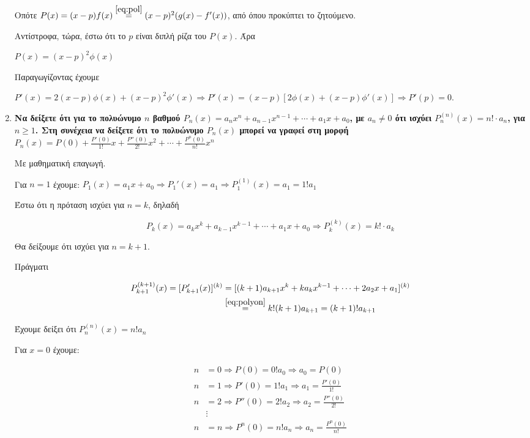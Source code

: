 \begin{enumerate}
\begin{solution}
			Οπότε $ P(x) = (x-p)f(x) \overset{\eqref{eq:pol}}{=} (x-p)^{2}(g(x)
			- f'(x)) $, από όπου προκύπτει το ζητούμενο.

			Αντίστροφα, τώρα, έστω ότι το $p$ είναι διπλή ρίζα του $ P(x) $. Άρα 

			$ P(x) = (x-p)^{2}\phi(x) $

			Παραγωγίζοντας έχουμε

			$ P'(x) = 2(x-p)\phi(x) + (x-p)^{2}\phi'(x) \Rightarrow P'(x) =
			(x-p)[2\phi(x) + (x-p)\phi'(x)] \Rightarrow P'(p) = 0 $.
  \end{solution}

		\item {\bfseries \boldmath Να δείξετε ότι για το πολυώνυμο $n$ βαθμού $ P_{n}(x) =a_{n}x^{n} +
		a_{n-1}x^{n-1} + \cdots + a_{1}x + a_{0} $, με  $ a_{n}\neq 0 $ ότι ισχύει $
		P_{n}^{(n)}(x) = n! \cdot a_{n}$, για  $n\geq 1 $. Στη συνέχεια να
		δείξετε ότι το πολυώνυμο $ P_{n}(x) $ μπορεί να γραφεί στη μορφή $ P_{n}(x) =
		P(0) + \frac{P'(0)}{1!} x + \frac{P''(0)}{2!} x^{2} + \cdots +
	\frac{P^{n}(0)}{n!} x^{n}$} 

  \begin{solution}


		Με μαθηματική επαγωγή.

		Για $ n=1 $ έχουμε: $ P_{1}(x) = a_{1}x + a_{0} \Rightarrow P_{1}'(x) =
		a_{1} \Rightarrow P_{1}^{(1)}(x)
		= a_{1} = 1!a_{1} $ 

		Έστω ότι η πρόταση ισχύει για $ n = k  $, δηλαδή

		\begin{equation}\label{eq:polyon}
			P_{k}(x) = a_{k}x^{k} + a_{k-1}x^{k-1}+ \cdots +a_{1}x + a_{0}
			\Rightarrow P_{k}^{(k)}(x) = k!\cdot a_{k}
		\end{equation}

		Θα δείξουμε ότι ισχύει για $ n = k+1 $.

		Πράγματι

		\begin{align*}
			P_{k+1}^{(k+1)}(x) = [P_{k+1}'(x)]^{(k)} 
			&= [(k+1)a_{k+1}x^{k} +	ka_{k}x^{k-1} + \cdots + 2a_{2}x + a_{1}]^{(k)} \\
			&\overset{\eqref{eq:polyon}}{=} k! (k+1) a_{k+1} = (k+1)!a_{k+1}
		\end{align*}	

		Έχουμε δείξει ότι $ P_{n}^{(n)}(x) = n! a_{n} $

		Για $ x = 0 $ έχουμε:

		\begin{align*}
			n &= 0 \Rightarrow P(0) = 0!a_{0} \Rightarrow a_{0} = P(0) \\
			n &= 1 \Rightarrow P'(0) = 1!a_{1} \Rightarrow a_{1} = \frac{P'(0)}{1!} \\ 
			n &= 2 \Rightarrow P''(0) = 2!a_{2} \Rightarrow a_{2} = \frac{P''(0)}{2!} \\
			  &\vdots \\
			n &= n \Rightarrow P^{n}(0) = n!a_{n} \Rightarrow a_{n} = \frac{P^{n}(0)}{n!} \\
		\end{align*}	


\end{solution}
\end{enumerate}
